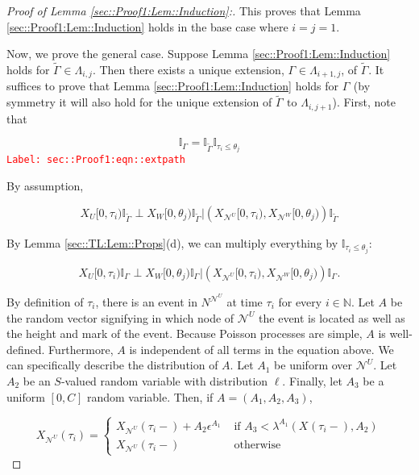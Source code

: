 \documentclass[12pt]{article}
\newcommand{\mb}{\mathbb}
\newcommand{\mc}{\mathcal}
\newcommand{\te}{\text}
\newcommand{\ep}{\epsilon}
\newcommand{\tr}{\textcolor{red}}
\newcommand{\labe}[1]{\tr{\texttt{Label: #1}}}
\newcommand{\ind}{\hspace{24pt}}
\renewcommand{\U}{U}							%
\newcommand{\UU}{W}								%
\renewcommand{\S}{S}							%
\newcommand{\ev}{\ep}							%
\newcommand{\X}{X}								%
\newcommand{\neigh}{\mc{N}}						%
\newcommand{\vind}[1]{^{#1}}					%
\newcommand{\cind}[1]{_{#1}}					%
\newcommand{\tp}[1]{(#1)}						%
\newcommand{\tip}[1]{#1}						%
\newcommand{\const}{C}							%
\newcommand{\poiss}{N}							%
\newcommand{\Sm}{\ell}							%
\newcommand{\rate}{\lambda}						%
\newcommand{\alt}[1]{\widetilde{#1}}			%
\newcommand{\indx}[1]{_{#1}}					%
\newcommand{\rt}{\tau}							%
\newcommand{\rtt}{\theta}						%
\newcommand{\apath}{\Gamma}						%
\newcommand{\pathset}[2]{\Lambda_{#1,#2}}		%
\newcommand{\rv}{A}								%
\begin{document}
\begin{proof}[Proof of Lemma \ref{sec::Proof1:Lem::Induction}:]
This proves that Lemma \ref{sec::Proof1:Lem::Induction} holds in the base case where \(i = j = 1\).

\ind Now, we prove the general case. Suppose Lemma \ref{sec::Proof1:Lem::Induction} holds for \(\alt{\apath\indx{}} \in \pathset{i}{j}\). Then there exists a unique extension, \(\apath\indx{} \in \pathset{i+1}{j}\), of \(\alt{\apath\indx{}}\). It suffices to prove that Lemma \ref{sec::Proof1:Lem::Induction} holds for \(\apath\indx{}\) (by symmetry it will also hold for the unique extension of \(\alt{\apath\indx{}} \te{ to } \pathset{i}{j+1}\)). First, note that

\begin{equation}
\mb{I}_{\apath\indx{}} = \mb{I}_{\alt{\apath\indx{}}}\mb{I}_{\rt\indx{i} \leq \rtt\indx{j}}
\label{sec::Proof1:eqn::extpath}
\end{equation}
\labe{sec::Proof1:eqn::extpath}

By assumption,

\[\X\cind{\U}\tip{[0,\rt\indx{i})}\mb{I}_{\alt{\apath\indx{}}}\perp \X\cind{\UU}\tip{[0,\rtt\indx{j})}\mb{I}_{\alt{\apath\indx{}}}|\left(\X\cind{\neigh\vind{\U}}\tip{[0,\rt\indx{i})},\X\cind{\neigh\vind{\UU}}\tip{[0,\rtt\indx{j})}\right)\mb{I}_{\alt{\apath\indx{}}}\]

By Lemma \ref{sec::TL:Lem::Props}(d), we can multiply everything by \(\mb{I}_{\rt\indx{i} \leq \rtt\indx{j}}\):

\[\X\cind{\U}\tip{[0,\rt\indx{i})}\mb{I}_{\apath\indx{}}\perp \X\cind{\UU}\tip{[0,\rtt\indx{j})}\mb{I}_{\apath\indx{}}|\left(\X\cind{\neigh\vind{\U}}\tip{[0,\rt\indx{i})},\X\cind{\neigh\vind{\UU}}\tip{[0,\rtt\indx{j})}\right)\mb{I}_{\apath\indx{}}.\]

By definition of \(\rt\indx{i}\), there is an event in \(\poiss\vind{\neigh\vind{\U}}\) at time \(\rt\indx{i}\) for every \(i \in \mb{ N}\). Let \(\rv\) be the random vector signifying in which node of \(\neigh\vind{\U}\) the event is located as well as the height and mark of the event. Because Poisson processes are simple, \(\rv\) is well-defined. Furthermore, \(\rv\) is independent of all terms in the equation above. We can specifically describe the distribution of \(\rv\). Let \(\rv\cind{1}\) be uniform over \(\neigh\vind{\U}\). Let \(\rv\cind{2}\) be an \(\S\)-valued random variable with distribution \(\Sm\). Finally, let \(\rv\cind{3}\) be a uniform \([0,\const\indx{}]\) random variable. Then, if \(\rv=(\rv\cind{1},\rv\cind{2},\rv\cind{3})\),

\[\X\cind{\neigh\vind{\U}}\tp{\rt\indx{i}} = \begin{cases}
\X\cind{\neigh\vind{\U}}\tp{\rt\indx{i}-} + \rv\cind{2}\ev\vind{\rv\cind{1}} &\te{ if } \rv\cind{3}< \rate\vind{\rv\cind{1}}(\X\cind{}\tp{\rt\indx{i}-}, \rv\cind{2})\\
\X\cind{\neigh\vind{\U}}\tp{\rt\indx{i}-} &\te{ otherwise}
\end{cases}\]


\end{proof}
\end{document}
